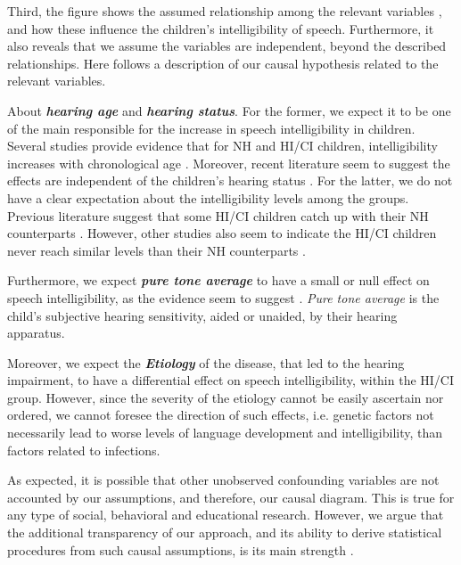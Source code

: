 Third, the figure shows the assumed relationship among the relevant variables \cite{Niparko_et_al_2010, Boons_et_al_2012, Gillis_2018, Fagan_et_al_2020}, and how these influence the children's intelligibility of speech. Furthermore, it also reveals that we assume the variables are independent, beyond the described relationships. Here follows a description of our causal hypothesis related to the relevant variables.

About \textbf{\textit{hearing age}} and \textbf{\textit{hearing status}}. For the former, we expect it to be one of the main responsible for the increase in speech intelligibility in children. Several studies provide evidence that for NH and HI/CI children, intelligibility increases with chronological age \cite{Chin_et_al_2001, Chin_et_al_2003, Flipsen_2006, Flipsen_2008, Baudonck_et_al_2009, Bowen_2011, Hustad_et_al_2020}. Moreover, recent literature seem to suggest the effects are independent of the children's hearing status \cite{Boonen_et_al_2021}. For the latter, we do not have a clear expectation about the intelligibility levels among the groups. Previous literature suggest that some HI/CI children catch up with their NH counterparts \cite{Wie_2010, Habib_et_al_2010, Boons_et_al_2013, Geers_et_al_2013, Bruijnzeel_et_al_2016, Dettman_et_al_2016, Wie_et_al_2020}. However, other studies also seem to indicate the HI/CI children never reach similar levels than their NH counterparts \cite{Nicholas_et_al_2007, Castellanos_et_al_2014, Chin_et_al_2014, Geers_et_al_2016, Freeman_et_al_2017, Duchesne_et_al_2019, Grandon_et_al_2020}. 

Furthermore, we expect \textbf{\textit{pure tone average}} to have a small or null effect on speech intelligibility, as the evidence seem to suggest \cite{Boonen_et_al_2021}. \textit{Pure tone average} is the child's subjective hearing sensitivity, aided or unaided, by their hearing apparatus.

Moreover, we expect the \textbf{\textit{Etiology}} of the disease, that led to the hearing impairment, to have a differential effect on speech intelligibility, within the HI/CI group. However, since the severity of the etiology cannot be easily ascertain nor ordered, we cannot foresee the direction of such effects, i.e. genetic factors not necessarily lead to worse levels of language development and intelligibility, than factors related to infections.

As expected, it is possible that other unobserved confounding variables are not accounted by our assumptions, and therefore, our causal diagram. This is true for any type of social, behavioral and educational research. However, we argue that the additional transparency of our approach, and its ability to derive statistical procedures from such causal assumptions, is its main strength \cite{McElreath_2020, Yarkoni_2020, Rohrer_et_al_2021}.

